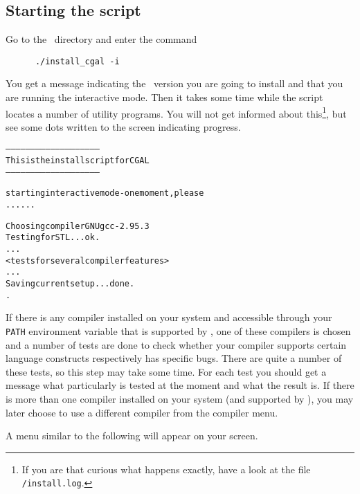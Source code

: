 \subsection{Starting the script}

Go to the \cgaldir\ directory and enter the command
\begin{verbatim}
      ./install_cgal -i
\end{verbatim}

You get a message indicating the \cgal\ version you are going to
install and that you are running the interactive mode. Then it takes
some time while the script locates a number of utility programs. You
will not get informed about this\footnote{If you are that curious what
  happens exactly, have a look at the file
  \texttt{\cgaldir/install.log}.}, but see some
dots written to the screen indicating progress.

{\ccTexHtml{\scriptsize}{}
\begin{alltt}
--------------------------------------------------------
  This is the install script for CGAL \cgalrelease
--------------------------------------------------------

starting interactive mode - one moment, please
......

  Choosing compiler GNU gcc-2.95.3
  Testing for STL ... ok.
  ...
  <tests for several compiler features>
  ...
  Saving current setup ... done.
.
\end{alltt}}
  
If there is any compiler installed on your system and accessible
through your \texttt{PATH} environment variable that is supported by
\cgal, one of these compilers is chosen and a number of tests are done
to check whether your compiler supports certain language constructs
respectively has specific bugs. There are quite a number of these
tests, so this step may take some time. For each test you should get a
message what particularly is tested at the moment and what the result
is. If there is more than one compiler installed on your system (and
supported by \cgal), you may later choose to use a different compiler
from the compiler menu.

A menu similar to the following will appear on your screen.

